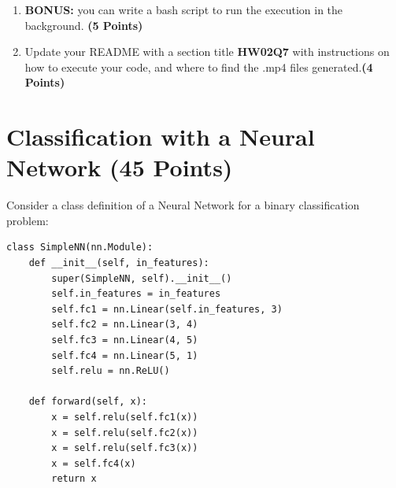 \documentclass[12pt, xcolor=dvipsnames,svgnames,x11names]{article}
\begin{document}
\begin{enumerate}
While making commit to GitHub, you should not commit media folder. You may add \texttt{media/} entry to your .gitignore to avoid committing this file inadvertently.

You should be able to generate a four animation movie corresponding to four weights $W_1 - W_4$ from the model provided in Homework 01. \hfill \textbf{(10 Points)}

You can also supply custom name for animation movie file as you see fit.

Parameters you would choose for your executing

\begin{enumerate}
\item dt = 0.04
\item epochs = 5000
\item eta = 0.01
\item number of features = 200
\item number of samples = 40000
\end{enumerate}

Now, at this point, you  may realize that it takes a long time to finish executing.


\item \textbf{BONUS:} you can write a bash script to run the execution in the background. \hfill \textbf{(5 Points)}

\item Update your README with a section title \textbf{HW02Q7} with instructions on how to execute your code, and where to find the .mp4 files generated.\hfill \textbf{(4 Points)}

\end{enumerate}



\section{Classification with a Neural Network (45 Points)}


Consider a class definition of a Neural Network for a binary classification problem:

\begin{verbatim}
class SimpleNN(nn.Module):
    def __init__(self, in_features):
        super(SimpleNN, self).__init__()
        self.in_features = in_features
        self.fc1 = nn.Linear(self.in_features, 3)
        self.fc2 = nn.Linear(3, 4)
        self.fc3 = nn.Linear(4, 5)
        self.fc4 = nn.Linear(5, 1)
        self.relu = nn.ReLU()

    def forward(self, x):
        x = self.relu(self.fc1(x))
        x = self.relu(self.fc2(x))
        x = self.relu(self.fc3(x))
        x = self.fc4(x)
        return x

\end{verbatim}
\end{document}
